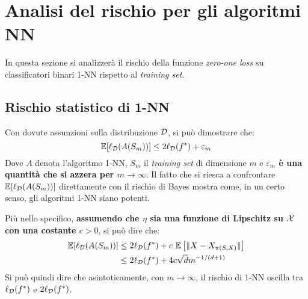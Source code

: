 \section{Analisi del rischio per gli algoritmi \texorpdfstring{NN}{NN}}

In questa sezione si analizzerà il rischio della funzione \textit{zero-one loss}
su classificatori binari 1-NN rispetto al \textit{training set}.

\subsection{Rischio statistico di 1-NN}

Con dovute assunzioni sulla distribuzione $\mathcal{D}$, si può dimostrare che:
$$ \mathbb{E}[\ell_{\mathcal{D}}(A(S_m))] \leq 2\ell_{\mathcal{D}}(f^*)+\varepsilon_m $$
Dove $A$ denota l'algoritmo 1-NN, $S_m$ il \textit{training set} di dimensione
$m$ e \textbf{$\varepsilon_m$ è una quantità che si azzera per 
$m\rightarrow\infty$}. Il fatto che si riesca a confrontare $\mathbb{E}[\ell_{\mathcal{D}}(A(S_m))]$
direttamente con il rischio di Bayes mostra come, in un certo senso, gli 
algoritmi 1-NN siano potenti.

Più nello specifico, \textbf{assumendo che $\eta$ sia una funzione di Lipschitz
su $\mathcal{X}$ con una costante $c>0$},
si può dire che:
\begin{align}
    \mathbb{E}[\ell_{\mathcal{D}}(A(S_m))] &\leq
        2\ell_{\mathcal{D}}(f^*)+c_{\phantom{i}}\mathbb{E}\left[\|X-X_{\pi(S,X)}\|\right]\notag\\
        &\leq 2\ell_{\mathcal{D}}(f^*)+4c\sqrt{d}m^{-1/(d+1)}\notag
\end{align}
Si può quindi dire che asintoticamente, con $m\rightarrow\infty$, il rischio di
1-NN oscilla tra $\ell_{\mathcal{D}}(f^*)$ e $2\ell_{\mathcal{D}}(f^*)$.
